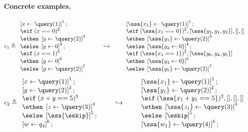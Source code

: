 \paragraph{Concrete examples.}
\[
c_1 \triangleq
\begin{array}{l}
     \left[x \leftarrow \query(1) \right]^1; \\
     \eif \; (x ==0)^{2} \; \\
    \ethen \; \left[y \leftarrow \query(2) \right]^3\; \\
    \eelse \; \left[y \leftarrow 0 \right]^4 ; \\
    \eif \; (x == 1 )^5\; \\
    \ethen \; \left[ y \leftarrow 0 \right]^6\; \\
    \eelse \; \left[y \leftarrow \query(2) \right]^7\\
\end{array}
%
%
\hspace{20pt} \hookrightarrow  \hspace{20pt}
%
\begin{array}{l}
     \left[ \ssa{x_1} \leftarrow \query(1) \right]^1; \\
     \eif \; (\ssa{x_1 ==0})^{2}, [\ssa{ y_3, y_1,y_2  }],[],[]  \; \\
    \ethen \; \left[ \ssa{y_1} \leftarrow \query(2) \right]^3\; \\
    \eelse \; \left[\ssa{y_2 \leftarrow 0 } \right]^4 ; \\
    \eif \; (\ssa{x_1 == 1} )^{5} , [\ssa{ y_6, y_4, y_5 } ] \; \\
    \ethen \; \left[ \ssa{y_4 \leftarrow 0} \right]^6\; \\
    \eelse \; \left[\ssa{y_5} \leftarrow \query(2) \right]^7\\
\end{array}
\]
\[
c_2 \triangleq
\begin{array}{l}
   \left[ x \leftarrow \query(1) \right]^1; \\
   \left[y \leftarrow \query(2) \right]^2 ; \\
    \eif \;( x + y == 5 )^3\; \\
    \ethen \;\left[ z \leftarrow \query(3)\right]^4 \; \\
    \eelse \;\left[ \ssa{\eskip}\right]^5 ; \\
   \left[ w \leftarrow q_4 \right]^6; \\
\end{array}
\hspace{20pt} \hookrightarrow \hspace{20pt}
%
\begin{array}{l}
   \left[ \ssa{ x_1 } \leftarrow \query(1) \right]^1; \\
   \left[\ssa{ y_1} \leftarrow \query(2) \right]^2 ; \\
    \eif \;( \ssa{ x_1 + y_1 == 5} )^3, [ ],[] ,[ ]\; \\
    \ethen \;\left[ \ssa{ z_1 }
    \leftarrow \query(3)\right]^4 \; \\
    \eelse \;\left[ \eskip\right]^5 ; \\
   \left[ \ssa{ w_1} \leftarrow \query(4) \right]^6; \\
\end{array}
\]


